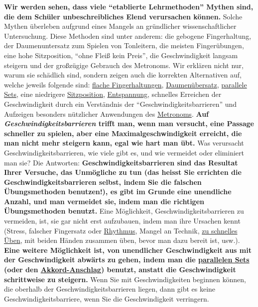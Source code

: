 \textbf{Wir werden sehen, dass viele \enquote{etablierte Lehrmethoden} Mythen sind, die dem Schüler unbeschreibliches Elend verursachen können.}
Solche Mythen überleben aufgrund eines Mangels an gründlicher wissenschaftlicher Untersuchung.
Diese Methoden sind unter anderem: die gebogene Fingerhaltung, der Daumenuntersatz zum Spielen von Tonleitern, die meisten Fingerübungen, eine hohe Sitzposition, \enquote{ohne Fleiß kein Preis}, die Geschwindigkeit langsam steigern und der großzügige Gebrauch des Metronoms.
Wir erklären nicht nur, warum sie schädlich sind, sondern zeigen auch die korrekten Alternativen auf, welche jeweils folgende sind: \hyperref[c1iii4b]{flache Fingerhaltungen}, \hyperref[c1iii5a]{Daumenübersatz}, \hyperref[c1ii11]{parallele Sets}, eine niedrigere \hyperref[c1ii3]{Sitzposition}, \hyperref[c1ii14]{Entspannung}, schnelles Erreichen der Geschwindigkeit durch ein Verständnis der \enquote{Geschwindigkeitsbarrieren} und Aufzeigen besonders nützlicher Anwendungen des \hyperref[c1ii19]{Metronoms}.
\textbf{Auf \textit{Geschwindigkeitsbarrieren} trifft man, wenn man versucht, eine Passage schneller zu spielen, aber eine Maximalgeschwindigkeit erreicht, die man nicht mehr steigern kann, egal wie hart man übt.}
Was verursacht Geschwindigkeitsbarrieren, wie viele gibt es, und wie vermeidet oder eliminiert man sie?
Die Antworten: \textbf{Geschwindigkeitsbarrieren sind das Resultat Ihrer Versuche, das Unmögliche zu tun (das heisst Sie errichten die Geschwindigkeitsbarrieren selbst, indem Sie die falschen Übungsmethoden benutzen!), es gibt im Grunde eine unendliche Anzahl, und man vermeidet sie, indem man die richtigen Übungsmethoden benutzt.}
Eine Möglichkeit, Geschwindigkeitsbarrieren zu vermeiden, ist, sie gar nicht erst aufzubauen, indem man ihre Ursachen kennt (Stress, falscher Fingersatz oder \hyperref[c1iii1b]{Rhythmus}, Mangel an Technik, \hyperref[c1ii13]{zu schnelles Üben}, mit beiden Händen zusammen üben, bevor man dazu bereit ist, usw.).
\textbf{Eine weitere Möglichkeit ist, von unendlicher Geschwindigkeit aus mit der Geschwindigkeit abwärts zu gehen, indem man die \hyperref[c1ii11]{parallelen Sets} (oder den \hyperref[c1ii9]{Akkord-Anschlag}) benutzt, anstatt die Geschwindigkeit schrittweise zu steigern.}
Wenn Sie mit Geschwindigkeiten beginnen können, die oberhalb der Geschwindigkeitsbarrieren liegen, dann gibt es keine Geschwindigkeitsbarriere, wenn Sie die Geschwindigkeit verringern.


